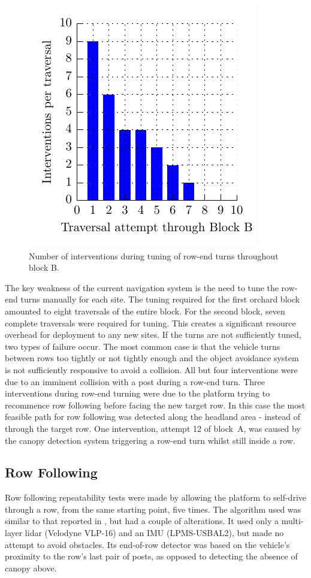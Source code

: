 \documentclass[preprint,authoryear,12pt]{elsarticle}
\begin{document}
    \begin{figure}[htb]
        \centering
        \includegraphics{imgs/tuning_graphs/newnham.pdf}
        \caption{
            Number of interventions during tuning of row-end turns throughout block B.
        }
        \label{fig:block_traversal_newnham}
    \end{figure}

    The key weakness of the current navigation system is the need to tune the row-end turns manually for each site.
    The tuning required for the first orchard block amounted to eight traversals of the entire block.
    For the second block, seven complete traversals were required for tuning.
    This creates a significant resource overhead for deployment to any new sites.
    If the turns are not sufficiently tuned, two types of failure occur.
    The most common case is that the vehicle turns between rows too tightly or not tightly enough and the object avoidance system is not sufficiently responsive to avoid a collision.
    All but four interventions were due to an imminent collision with a post during a row-end turn.
    Three interventions during row-end turning were due to the platform trying to recommence row following before facing the new target row.
    In this case the most feasible path for row following was detected along the headland area - instead of through the target row.
    One intervention, attempt 12 of block~A, was caused by the canopy detection system triggering a row-end turn whilst still inside a row.

  \subsection{Row Following}
    Row following repeatability tests were made by allowing the platform to self-drive through a row, from the same starting point, five times.
    The algorithm used was similar to that reported in \cite{Bell2016}, but had a couple of alterations.
    It used only a multi-layer lidar (Velodyne VLP-16) and an IMU (LPMS-USBAL2), but made no attempt to avoid obstacles.
    Its end-of-row detector was based on the vehicle's proximity to the row's last pair of posts, as opposed to detecting the absence of canopy above.
\end{document}
